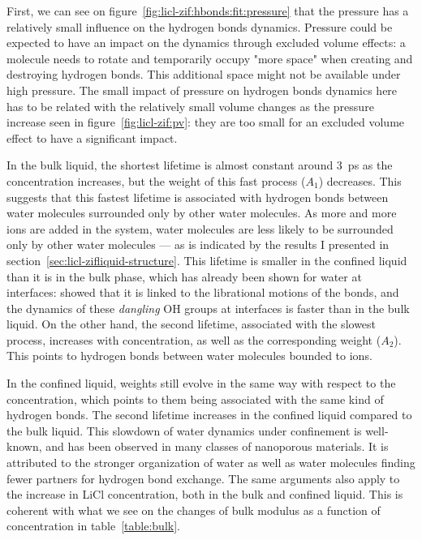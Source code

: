 \documentclass[thesis]{subfiles}
\begin{document}
%     

First, we can see on figure~\ref{fig:licl-zif:hbonds:fit:pressure} that the
pressure has a relatively small influence on the hydrogen bonds dynamics.
Pressure could be expected to have an impact on the dynamics through excluded
volume effects\cite{Fogarty2014}: a molecule needs to rotate and temporarily
occupy "more space" when creating and destroying hydrogen bonds. This
additional space might not be available under high pressure. The small impact of
pressure on hydrogen bonds dynamics here has to be related with the relatively
small volume changes as the pressure increase seen in
figure~\ref{fig:licl-zif:pv}: they are too small for an excluded volume effect
to have a significant impact.

In the bulk liquid, the shortest lifetime is almost constant around \SI{3}{ps}
as the concentration increases, but the weight of this fast process ($A_1$)
decreases. This suggests that this fastest lifetime is associated with hydrogen
bonds between water molecules surrounded only by other water molecules. As more
and more ions are added in the system, water molecules are less likely to be
surrounded only by other water molecules --- as is indicated by the results I
presented in section~\ref{sec:licl-zifliquid-structure}. This lifetime is
smaller in the confined liquid than it is in the bulk phase, which has already
been shown for water at interfaces: \citeauthor{Fogarty2014}\cite{Fogarty2014}
showed that it is linked to the librational motions of the  bonds, and
the dynamics of these \emph{dangling} OH groups at interfaces is faster than in
the bulk liquid\cite{Scatena2001}. On the other hand, the second lifetime,
associated with the slowest process, increases with concentration, as well as the
corresponding weight ($A_2$). This points to hydrogen bonds between water
molecules bounded to ions.

In the confined liquid, weights still evolve in the same way with respect to the
concentration, which points to them being associated with the same kind of
hydrogen bonds. The second lifetime increases in the confined liquid compared to
the bulk liquid. This slowdown of water dynamics under confinement is
well-known\cite{Fogarty2014}, and has been observed in many classes of
nanoporous materials\cite{Jeffery2004, RomeroVargasCastrillon2009, Haigis2013,
Scalfi2018}. It is attributed to the stronger organization of water as well as
water molecules finding fewer partners for hydrogen bond exchange. The same
arguments also apply to the increase in LiCl concentration, both in the bulk and
confined liquid. This is coherent with what we see on the changes of bulk
modulus as a function of concentration in table~\ref{table:bulk}.
\end{document}
